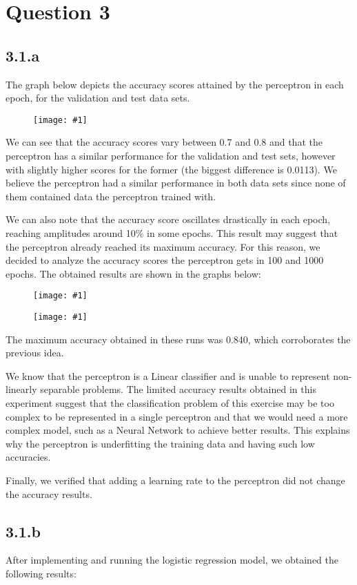 \documentclass[10pt]{article}
\newcommand{\img}[1]{\begin{figure}[H]\centering\texttt{[image: \#1]}\end{figure}}
\begin{document}
\section{Question 3}
\subsection{3.1.a}
The graph below depicts the accuracy scores attained by the perceptron in each epoch, for the validation and test data sets.

\img{results/q3/1_a/acc_20-epochs.png}

We can see that the accuracy scores vary between 0.7 and 0.8 and that the perceptron has a similar performance for the validation and test sets, however with slightly higher scores for the former (the biggest difference is 0.0113). We believe the perceptron had a similar performance in both data sets since none of them contained data the perceptron trained with.

We can also note that the accuracy score oscillates drastically in each epoch, reaching amplitudes around 10\% in some epochs. This result may suggest that the perceptron already reached its maximum accuracy.
For this reason, we decided to analyze the accuracy scores the perceptron gets in 100 and 1000 epochs. The obtained results are shown in the graphs below:

\img{results/q3/1_a/acc_100-epochs.png}
\img{results/q3/1_a/acc_1000-epochs.png}

The maximum accuracy obtained in these runs was 0.840, which corroborates the previous idea.

We know that the perceptron is a Linear classifier and is unable to represent non-linearly separable problems. The limited accuracy results obtained in this experiment suggest that the classification problem of this exercise may be too complex to be represented in a single perceptron and that we would need a more complex model, such as a Neural Network to achieve better results. This explains why the perceptron is underfitting the training data and having such low accuracies.

Finally, we verified that adding a learning rate to the perceptron did not change the accuracy results.

\subsection{3.1.b}
After implementing and running the logistic regression model, we obtained the following results:
\end{document}
